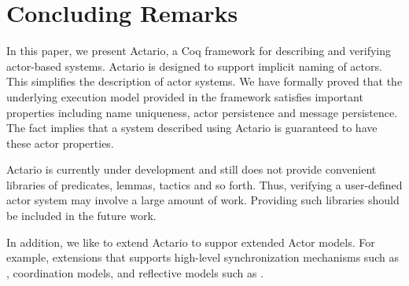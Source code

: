\section{Concluding Remarks}
\label{sec:conclusion}

In this paper, we present Actario, a Coq framework for describing and
verifying actor-based systems. Actario is designed to support implicit
naming of actors. This simplifies the description of actor systems.
We have formally proved that the underlying execution model provided
in the framework satisfies important properties including name
uniqueness, actor persistence and message persistence.  The fact
implies that a system described using Actario is guaranteed to have
these actor properties.

Actario is currently under development and still does not provide
convenient libraries of predicates, lemmas, tactics and so
forth. Thus, verifying a user-defined actor system may involve a large
amount of work. Providing such libraries should be included in the
future work.

In addition, we like to extend Actario to suppor extended Actor
models. For example, extensions that supports high-level
synchronization mechanisms such as \cite{De-Koster:2012aa},
coordination models\cite{Talcott:2011aa}, and reflective models such
as \cite{Watanabe:2013aa}.
